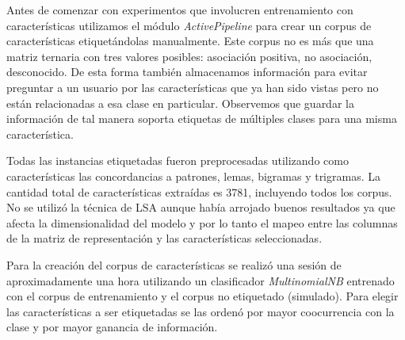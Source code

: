 

Antes de comenzar con experimentos que involucren entrenamiento con características utilizamos el módulo \textit{ActivePipeline} para crear un corpus de características etiquetándolas manualmente. Este corpus no es más que una matriz ternaria con tres valores posibles: asociación positiva, no asociación, desconocido. De esta forma también almacenamos información para evitar preguntar a un usuario por las características que ya han sido vistas pero no están relacionadas a esa clase en particular. Observemos que guardar la información de tal manera soporta etiquetas de múltiples clases para una misma característica.

Todas las instancias etiquetadas fueron preprocesadas utilizando como características las concordancias a patrones, lemas, bigramas y trigramas. La cantidad total de características extraídas es 3781, incluyendo todos los corpus. No se utilizó la técnica de LSA aunque había arrojado buenos resultados ya que afecta la dimensionalidad del modelo y por lo tanto el mapeo entre las columnas de la matriz de representación y las características seleccionadas.

Para la creación del corpus de características se realizó una sesión de aproximadamente una hora utilizando un clasificador \textit{MultinomialNB} entrenado con el corpus de entrenamiento y el corpus no etiquetado (simulado). Para elegir las características a ser etiquetadas se las ordenó por mayor coocurrencia con la clase y por mayor ganancia de información.

